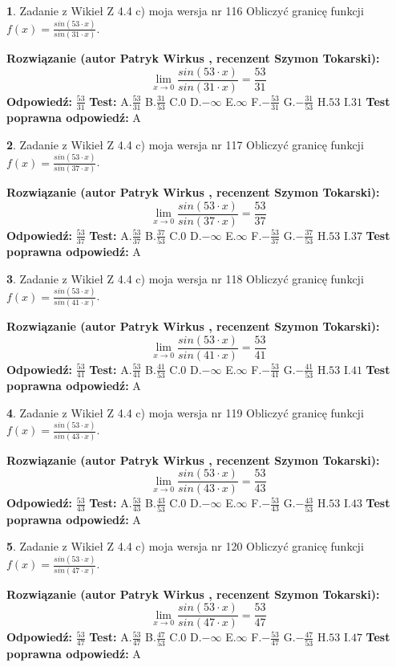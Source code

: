 \documentclass[12pt, a4paper]{article}
\theoremstyle{definition} %
\newtheorem{zad}{}
\newcommand{\zadStart}[1]{\begin{zad}#1\newline}
\newcommand{\zadStop}{\end{zad}}
\newcommand{\rozwStart}[2]{\noindent \textbf{Rozwiązanie (autor #1 , recenzent #2): }\newline}
\newcommand{\rozwStop}{\newline}
\newcommand{\odpStart}{\noindent \textbf{Odpowiedź:}\newline}
\newcommand{\odpStop}{\newline}
\newcommand{\testStart}{\noindent \textbf{Test:}\newline}
\newcommand{\testStop}{\newline}
\newcommand{\kluczStart}{\noindent \textbf{Test poprawna odpowiedź:}\newline}
\newcommand{\kluczStop}{\newline}
\begin{document}
\zadStart{Zadanie z Wikieł Z 4.4 c) moja wersja nr 116}
Obliczyć granicę funkcji $f(x)=\frac{sin(53\cdot x)}{sin(31\cdot x)}$.
\zadStop
\rozwStart{Patryk Wirkus}{Szymon Tokarski}
$$\lim\limits_{x\to 0}\frac{sin(53\cdot x)}{sin(31\cdot x)}=
\frac{53}{31}$$
\rozwStop
\odpStart
$\frac{53}{31}$
\odpStop
\testStart
A.$\frac{53}{31}$
B.$\frac{31}{53}$
C.$0$
D.$-\infty$
E.$\infty$
F.$-\frac{53}{31}$
G.$-\frac{31}{53}$
H.$53$
I.$31$
\testStop
\kluczStart
A
\kluczStop



\zadStart{Zadanie z Wikieł Z 4.4 c) moja wersja nr 117}
Obliczyć granicę funkcji $f(x)=\frac{sin(53\cdot x)}{sin(37\cdot x)}$.
\zadStop
\rozwStart{Patryk Wirkus}{Szymon Tokarski}
$$\lim\limits_{x\to 0}\frac{sin(53\cdot x)}{sin(37\cdot x)}=
\frac{53}{37}$$
\rozwStop
\odpStart
$\frac{53}{37}$
\odpStop
\testStart
A.$\frac{53}{37}$
B.$\frac{37}{53}$
C.$0$
D.$-\infty$
E.$\infty$
F.$-\frac{53}{37}$
G.$-\frac{37}{53}$
H.$53$
I.$37$
\testStop
\kluczStart
A
\kluczStop



\zadStart{Zadanie z Wikieł Z 4.4 c) moja wersja nr 118}
Obliczyć granicę funkcji $f(x)=\frac{sin(53\cdot x)}{sin(41\cdot x)}$.
\zadStop
\rozwStart{Patryk Wirkus}{Szymon Tokarski}
$$\lim\limits_{x\to 0}\frac{sin(53\cdot x)}{sin(41\cdot x)}=
\frac{53}{41}$$
\rozwStop
\odpStart
$\frac{53}{41}$
\odpStop
\testStart
A.$\frac{53}{41}$
B.$\frac{41}{53}$
C.$0$
D.$-\infty$
E.$\infty$
F.$-\frac{53}{41}$
G.$-\frac{41}{53}$
H.$53$
I.$41$
\testStop
\kluczStart
A
\kluczStop



\zadStart{Zadanie z Wikieł Z 4.4 c) moja wersja nr 119}
Obliczyć granicę funkcji $f(x)=\frac{sin(53\cdot x)}{sin(43\cdot x)}$.
\zadStop
\rozwStart{Patryk Wirkus}{Szymon Tokarski}
$$\lim\limits_{x\to 0}\frac{sin(53\cdot x)}{sin(43\cdot x)}=
\frac{53}{43}$$
\rozwStop
\odpStart
$\frac{53}{43}$
\odpStop
\testStart
A.$\frac{53}{43}$
B.$\frac{43}{53}$
C.$0$
D.$-\infty$
E.$\infty$
F.$-\frac{53}{43}$
G.$-\frac{43}{53}$
H.$53$
I.$43$
\testStop
\kluczStart
A
\kluczStop



\zadStart{Zadanie z Wikieł Z 4.4 c) moja wersja nr 120}
Obliczyć granicę funkcji $f(x)=\frac{sin(53\cdot x)}{sin(47\cdot x)}$.
\zadStop
\rozwStart{Patryk Wirkus}{Szymon Tokarski}
$$\lim\limits_{x\to 0}\frac{sin(53\cdot x)}{sin(47\cdot x)}=
\frac{53}{47}$$
\rozwStop
\odpStart
$\frac{53}{47}$
\odpStop
\testStart
A.$\frac{53}{47}$
B.$\frac{47}{53}$
C.$0$
D.$-\infty$
E.$\infty$
F.$-\frac{53}{47}$
G.$-\frac{47}{53}$
H.$53$
I.$47$
\testStop
\kluczStart
A
\kluczStop
\end{document}
